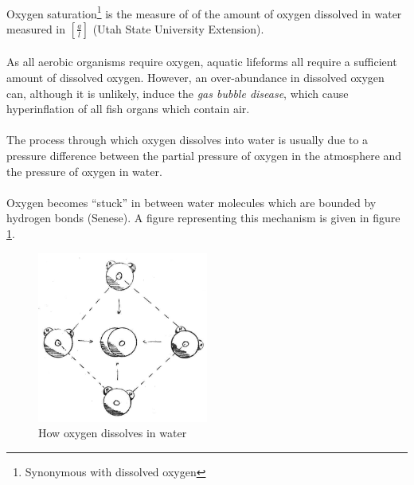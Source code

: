 \documentclass[a4paper]{article}
\begin{document}
\paragraph*{}
Oxygen saturation\footnote{Synonymous with dissolved oxygen} is the measure of
of the amount of oxygen dissolved in water measured in $\left[
\frac{\si{g}}{\si{l}} \right]$ (Utah State University Extension).

\paragraph*{}
As all aerobic organisms require oxygen, aquatic lifeforms all require a
sufficient amount of dissolved oxygen. However, an over-abundance in dissolved
oxygen can, although it is unlikely, induce the \textit{gas bubble disease},
which cause hyperinflation of all fish organs which contain air.

\paragraph*{}
The process through which oxygen dissolves into water is usually due to a
pressure difference between the partial pressure of oxygen in the atmosphere
and the pressure of oxygen in water.

\paragraph*{}
Oxygen becomes ``stuck'' in between water molecules which are bounded by
hydrogen bonds (Senese). A figure representing this mechanism is given in
figure \ref{fig:do}.

\begin{figure}[ht]
  \centering
  \includegraphics[width=0.5\textwidth]{img/do}
  \caption{How oxygen dissolves in water}
  \label{fig:do}
\end{figure}
\end{document}
